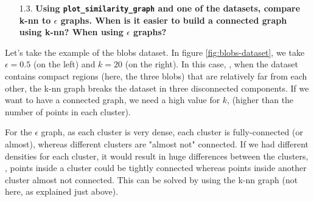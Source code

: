 \documentclass[a4paper, 11pt]{report}
\begin{document}
    \pagebreak
    
\begin{itemize}
    \item[1.3.] \textbf{Using \texttt{plot\_similarity\_graph} and one of the datasets, compare k-nn to $\epsilon$ graphs. When is it easier to build a connected graph using k-nn? When using $\epsilon$ graphs?}
\end{itemize}

    Let's take the example of the blobs dataset. In figure \ref{fig:blobs-dataset}, we take $\epsilon = 0.5$ (on the left) and $k = 20$ (on the right). In this case, \ie, when the dataset contains compact regions (here, the three blobs) that are relatively far from each other, the k-nn graph breaks the dataset in three disconnected components. If we want to have a connected graph, we need a high value for $k$, (\eg higher than the number of points in each cluster).
    
    For the $\epsilon$ graph, as each cluster is very dense, each cluster is fully-connected (or almost), whereas different clusters are "almost not" connected. If we had different densities for each cluster, it would result in huge differences between the clusters, \ie, points inside a cluster could be tightly connected whereas points inside another cluster almost not connected. This can be solved by using the k-nn graph (not here, as explained just above).
    
\end{document}
